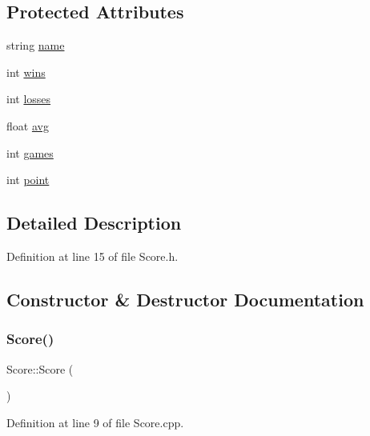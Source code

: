 \subsection*{Protected Attributes}
\begin{DoxyCompactItemize}
\item 
string \hyperlink{class_score_a5344ecc1bc167a6fd99aec0fe6d04a60}{name}
\item 
int \hyperlink{class_score_a5bdcbfa7299aecece44b67a8150efc1d}{wins}
\item 
int \hyperlink{class_score_a571dfba97776842fd2558a77992cfe22}{losses}
\item 
float \hyperlink{class_score_a64e012df968fcf3367cb6ecf02ed62a3}{avg}
\item 
int \hyperlink{class_score_a9076da395b3860d36f2a0e0e9c618b49}{games}
\item 
int \hyperlink{class_score_ab43e949a772acc77bb555fb3d7ccbc65}{point}
\end{DoxyCompactItemize}


\subsection{Detailed Description}


Definition at line 15 of file Score.\+h.



\subsection{Constructor \& Destructor Documentation}
\hypertarget{class_score_a039c99843551e5e4b512ecee99e46617}{}\label{class_score_a039c99843551e5e4b512ecee99e46617} 
\subsubsection{\texorpdfstring{Score()}{Score()}\hspace{0.1cm}{\footnotesize\ttfamily [1/2]}}
{\footnotesize\ttfamily Score\+::\+Score (\begin{DoxyParamCaption}{ }\end{DoxyParamCaption})}



Definition at line 9 of file Score.\+cpp.

\hypertarget{class_score_ae5367b41f700069f9e2ce9497e66426f}{}\label{class_score_ae5367b41f700069f9e2ce9497e66426f} 
